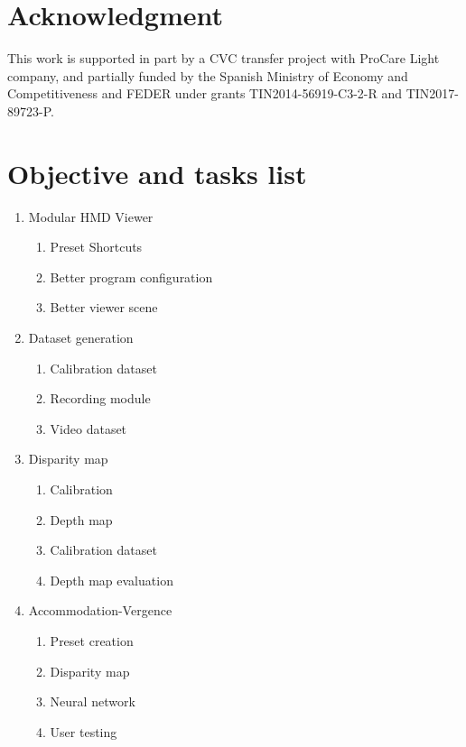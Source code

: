 \documentclass[10pt,a4paper,twocolumn,twoside]{article}
\begin{document}
	

	\section{Acknowledgment}
	This work is supported in part by a CVC transfer project with ProCare Light company, and partially funded by the Spanish Ministry of Economy and Competitiveness and FEDER under grants TIN2014-56919-C3-2-R and TIN2017-89723-P.
	
	
	

	\appendix

	\section{Objective and tasks list}
	\begin{enumerate}
		\item \label{obj:viewer} Modular HMD Viewer 
		\begin{enumerate}
			\item Preset Shortcuts
			\item Better program configuration
			\item Better viewer scene
		\end{enumerate}
	
		\item Dataset generation
		\begin{enumerate}
			\item Calibration dataset
			\item \label{obj:dataset:record} Recording module
			\item \label{obj:dataset:video} Video dataset
		\end{enumerate}
	
		\item \label{obj:dispmap} Disparity map
		\begin{enumerate}
			\item Calibration
			\item Depth map
			\item Calibration dataset
			\item \label{obj:dispmap:eval} Depth map evaluation
		\end{enumerate}
	
		\item \label{obj:acc} Accommodation-Vergence
		\begin{enumerate}
			\item \label{obj:acc:preset} Preset creation
			\item \label{obj:acc:dispmap} Disparity map
			\item \label{obj:acc:nn} Neural network
			\item User testing
		\end{enumerate}
	

\end{enumerate}
\end{document}
